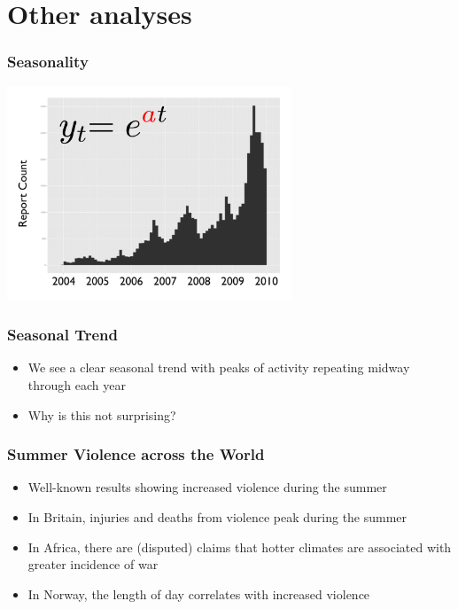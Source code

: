 \documentclass[xcolor=dvipsnames, 9pt]{beamer}
\begin{document}

\section{Other analyses} %
\label{sec:other_analyses}

\begin{frame}[fragile]
  \frametitle{Seasonality}
  \begin{center}
    \includegraphics[width = 8.5cm]{time_course.png}
  \end{center}
\end{frame}

\begin{frame}[fragile]
  \frametitle{Seasonal Trend}
  \begin{itemize}
    \item{We see a clear seasonal trend with peaks of activity repeating midway through each year}
    \item{Why is this not surprising?}
  \end{itemize}
\end{frame}

\begin{frame}[fragile]
  \frametitle{Summer Violence across the World}
  \begin{itemize}
    \item{Well-known results showing increased violence during the summer}
    \item{In Britain, injuries and deaths from violence peak during the summer}
    \item{In Africa, there are (disputed) claims that hotter climates are associated with greater incidence of war}
    \item{In Norway, the length of day correlates with increased violence}
  \end{itemize}
\end{frame}
\end{document}
